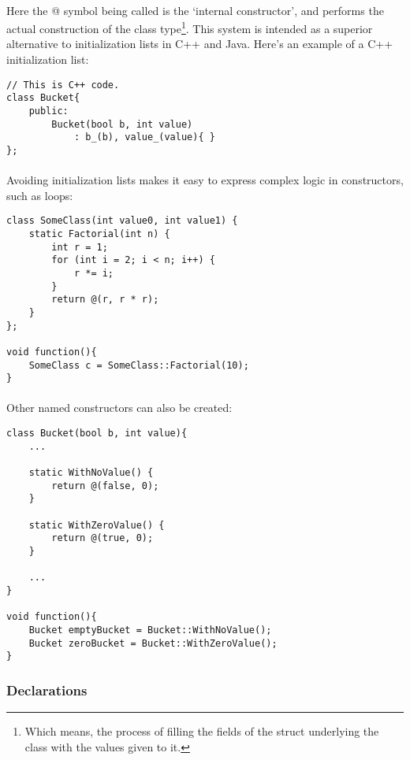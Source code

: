 \documentclass[12pt,twoside,notitlepage]{report}
\begin{document}
\paragraph{}
Here the @ symbol being called is the `internal constructor', and performs the actual construction of the class type\footnote{Which means, the process of filling the fields of the struct underlying the class with the values given to it.}. This system is intended as a superior alternative to initialization lists in C++ and Java. Here's an example of a C++ initialization list:


\begin{lstlisting}
// This is C++ code.
class Bucket{
	public:
		Bucket(bool b, int value)
			: b_(b), value_(value){ }
};
\end{lstlisting}


\paragraph{}
Avoiding initialization lists makes it easy to express complex logic in constructors, such as loops:


\begin{lstlisting}
class SomeClass(int value0, int value1) {
	static Factorial(int n) {
		int r = 1;
		for (int i = 2; i < n; i++) {
			r *= i;
		}
		return @(r, r * r);
	}
};

void function(){
	SomeClass c = SomeClass::Factorial(10);
}
\end{lstlisting}


\paragraph{}
Other named constructors can also be created:


\begin{lstlisting}
class Bucket(bool b, int value){
	...
	
	static WithNoValue() {
		return @(false, 0);
	}
	
	static WithZeroValue() {
		return @(true, 0);
	}

	...
}

void function(){
	Bucket emptyBucket = Bucket::WithNoValue();
	Bucket zeroBucket = Bucket::WithZeroValue();
}
\end{lstlisting}


\subsubsection{Declarations}
\end{document}
